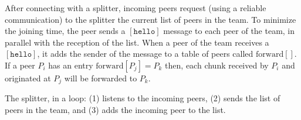 
\label{sec:joining}

After connecting with a splitter, incoming peers request (using a
reliable communication) to the splitter the current list of peers in
the team. To minimize the joining time, the peer sends a
$[\mathtt{hello}]$ message to each peer of the team, in parallel
with the reception of the list. When a peer of the team receives a
$[\mathtt{hello}]$, it adds the sender of the message to a table of peers
called $\text{forward}[]$. If a peer $P_i$ has an entry
$\text{forward}[P_j]=P_k$ then, each chunk received by $P_i$ and
originated at $P_j$ will be forwarded to $P_k$.


The splitter, in a loop: (1) listens to the incoming peers, (2) sends
the list of peers in the team, and (3) adds the incoming peer to the
list.

\begin{comment}
\begin{figure*}
  \fig{1000}{10cm}{joining} \caption{Code related to team
    joining.\label{fig:joining}}
\end{figure*}

The new pseudo-code related to joining a team is describen in the
Fig.~\ref{fig:joining}.
\end{comment}
